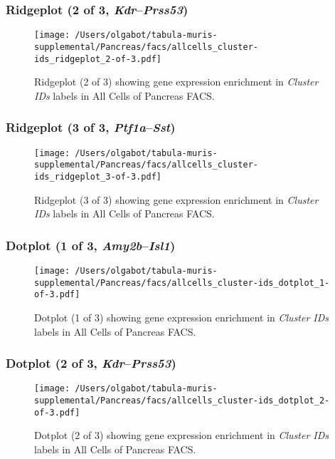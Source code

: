 \clearpage

\subsubsection{Ridgeplot (2 of 3, \emph{Kdr}--\emph{Prss53})}
\begin{figure}[h]
\centering
\texttt{[image: /Users/olgabot/tabula-muris-supplemental/Pancreas/facs/allcells\_cluster-ids\_ridgeplot\_2-of-3.pdf]}

\caption{ Ridgeplot (2 of 3)  showing gene expression enrichment in \emph{Cluster IDs} labels in All Cells of Pancreas FACS. }
\end{figure}


\clearpage

\subsubsection{Ridgeplot (3 of 3, \emph{Ptf1a}--\emph{Sst})}
\begin{figure}[h]
\centering
\texttt{[image: /Users/olgabot/tabula-muris-supplemental/Pancreas/facs/allcells\_cluster-ids\_ridgeplot\_3-of-3.pdf]}

\caption{ Ridgeplot (3 of 3)  showing gene expression enrichment in \emph{Cluster IDs} labels in All Cells of Pancreas FACS. }
\end{figure}


\clearpage

\subsubsection{Dotplot (1 of 3, \emph{Amy2b}--\emph{Isl1})}
\begin{figure}[h]
\centering
\texttt{[image: /Users/olgabot/tabula-muris-supplemental/Pancreas/facs/allcells\_cluster-ids\_dotplot\_1-of-3.pdf]}

\caption{ Dotplot (1 of 3)  showing gene expression enrichment in \emph{Cluster IDs} labels in All Cells of Pancreas FACS. }
\end{figure}


\clearpage

\subsubsection{Dotplot (2 of 3, \emph{Kdr}--\emph{Prss53})}
\begin{figure}[h]
\centering
\texttt{[image: /Users/olgabot/tabula-muris-supplemental/Pancreas/facs/allcells\_cluster-ids\_dotplot\_2-of-3.pdf]}

\caption{ Dotplot (2 of 3)  showing gene expression enrichment in \emph{Cluster IDs} labels in All Cells of Pancreas FACS. }
\end{figure}


